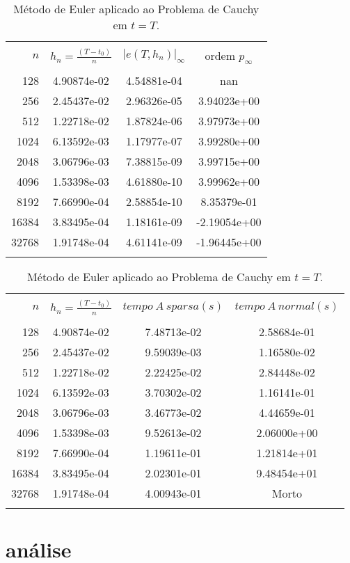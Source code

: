 \documentclass[a4paper,10pt]{article}
\begin{document}
\begin{table}[!ht]
	\centering
	\begin{tabular}{rccc}\hline\hline\\
		$n$ &$h_n=\displaystyle \frac{(T-t_0)}{n}$ & $\left|e(T, h_n)\right|_\infty$  & ordem $p_\infty$ \\ 
		\hline\hline
		\\
		128 & 4.90874e-02 & 4.54881e-04&nan\\
		256 & 2.45437e-02 & 2.96326e-05&3.94023e+00\\
		512 & 1.22718e-02 & 1.87824e-06&3.97973e+00\\
		1024 & 6.13592e-03 & 1.17977e-07&3.99280e+00\\
		2048 & 3.06796e-03 & 7.38815e-09&3.99715e+00\\
		4096 & 1.53398e-03 & 4.61880e-10&3.99962e+00\\
		8192 & 7.66990e-04 & 2.58854e-10&8.35379e-01\\
		16384 & 3.83495e-04 & 1.18161e-09&-2.19054e+00\\
		32768 & 1.91748e-04 & 4.61141e-09&-1.96445e+00\\
		\\
		\hline\hline
	\end{tabular}
	\caption{Método de Euler aplicado ao Problema de Cauchy em $t=T$. 
	}
	\label{tabmodel-2}
\end{table}

\begin{table}[!ht]
	\centering
	\begin{tabular}{rccc}\hline\hline\\
		$n$ &$h_n=\displaystyle \frac{(T-t_0)}{n}$ & $tempo\ A\ sparsa(s)$  & $tempo\ A\ normal (s)$ \\ 
		\hline\hline
		\\
128 & 4.90874e-02 & 7.48713e-02 & 2.58684e-01\\
256 & 2.45437e-02 & 9.59039e-03 & 1.16580e-02\\
512 & 1.22718e-02 & 2.22425e-02 & 2.84448e-02\\
1024 & 6.13592e-03 & 3.70302e-02 & 1.16141e-01\\
2048 & 3.06796e-03 & 3.46773e-02 & 4.44659e-01\\
4096 & 1.53398e-03 & 9.52613e-02 & 2.06000e+00\\
8192 & 7.66990e-04 & 1.19611e-01 & 1.21814e+01\\
16384 & 3.83495e-04 & 2.02301e-01 & 9.48454e+01\\
32768 & 1.91748e-04 & 4.00943e-01 & Morto\\
\\
\hline\hline
\end{tabular}
\caption{Método de Euler aplicado ao Problema de Cauchy em $t=T$. 
}
\label{tabmodel-3}
\end{table}

\section{análise}
\end{document}
